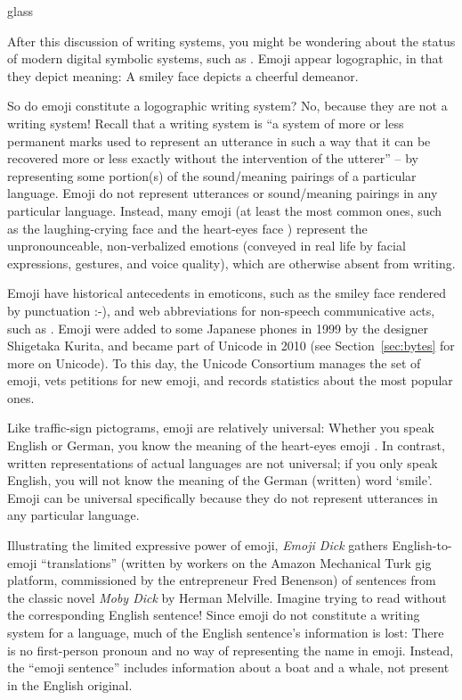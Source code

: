 \begin{tblsfilledsymbol}{}{glass}
\begin{underthehood}

After this discussion of writing systems, you might be wondering about the status of  modern digital symbolic systems, such as .  Emoji appear logographic, in that they depict meaning: A smiley face depicts a cheerful demeanor.

So do emoji constitute a logographic writing system?  No, because they are not a writing system!  Recall that a writing system is ``a system of more or less permanent marks used to represent  an  utterance  in  such  a  way  that  it  can  be  recovered  more  or less  exactly  without  the  intervention  of  the  utterer'' \citep{daniels:bright:96} -- by representing some portion(s) of the sound/meaning pairings of a particular language.  Emoji do not represent utterances or sound/meaning pairings in any particular language.  Instead, many emoji (at least the most common ones, such as the laughing-crying face \laughing \text{} and the heart-eyes face \heart) represent the unpronounceable, non-verbalized emotions (conveyed in real life by facial expressions, gestures, and voice quality), which are otherwise absent from writing.




Emoji have historical antecedents in emoticons, such as the smiley face rendered by punctuation :-), and web abbreviations for non-speech communicative acts, such as .  Emoji were added to some Japanese phones in 1999  by the designer Shigetaka Kurita, and became part of Unicode in 2010 (see Section~\ref{sec:bytes} for more on Unicode).  To this day, the Unicode Consortium manages the set of emoji, vets petitions for new emoji, and records statistics about the most popular ones.



 Like traffic-sign pictograms, emoji are relatively universal: Whether you speak English or German, you know the meaning of the heart-eyes emoji \heart.  In contrast, written representations of actual languages are not universal; if you only speak English, you will not know the meaning of the German (written) word  `smile'. Emoji can be universal specifically because they do not represent utterances in any particular language.
 
Illustrating the limited expressive power of emoji, \emph{Emoji Dick} \citep{Benenson:2010} gathers English-to-emoji  ``translations'' (written by workers on the Amazon Mechanical Turk gig platform, commissioned by the entrepreneur Fred Benenson) of sentences from the classic novel \emph{Moby Dick} by Herman Melville.  Imagine trying to read  without the corresponding English sentence!  Since emoji do not constitute a writing system for a language, much of the English sentence's information is lost: There is no first-person pronoun and no way of representing the name  in emoji.  Instead, the ``emoji sentence''  includes information about a boat and a whale,  not present in the English original. 


\end{underthehood}
\end{tblsfilledsymbol}
